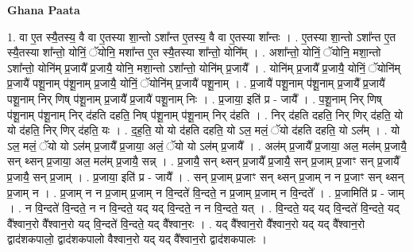\documentclass[17pt]{extarticle}
\begin{document}
\textbf{Ghana Paata } \newline

1. वा ए॒त स्यै॒तस्य॒ वै वा ए॒तस्या शा॒न्तो ऽशा᳚न्त ए॒तस्य॒ वै वा ए॒तस्या शा᳚न्तः । . ए॒तस्या शा॒न्तो ऽशा᳚न्त ए॒त स्यै॒तस्या शा᳚न्तो॒ योनिं॒ ॅयोनि॒ मशा᳚न्त ए॒त स्यै॒तस्या शा᳚न्तो॒ योनि᳚म् । . अशा᳚न्तो॒ योनिं॒ ॅयोनि॒ मशा॒न्तो ऽशा᳚न्तो॒ योनि॑म् प्र॒जायै᳚ प्र॒जायै॒ योनि॒ मशा॒न्तो ऽशा᳚न्तो॒ योनि॑म् प्र॒जायै᳚ । . योनि॑म् प्र॒जायै᳚ प्र॒जायै॒ योनिं॒ ॅयोनि॑म् प्र॒जायै॑ पशू॒नाम् प॑शू॒नाम् प्र॒जायै॒ योनिं॒ ॅयोनि॑म् प्र॒जायै॑ पशू॒नाम् । . प्र॒जायै॑ पशू॒नाम् प॑शू॒नाम् प्र॒जायै᳚ प्र॒जायै॑ पशू॒नाम् निर् णिष् प॑शू॒नाम् प्र॒जायै᳚ प्र॒जायै॑ पशू॒नाम् निः । . प्र॒जाया॒ इति॑ प्र - जायै᳚ । . प॒शू॒नाम् निर् णिष् प॑शू॒नाम् प॑शू॒नाम् निर् द॑हति दहति॒ निष् प॑शू॒नाम् प॑शू॒नाम् निर् द॑हति । . निर् द॑हति दहति॒ निर् णिर् द॑हति॒ यो यो द॑हति॒ निर् णिर् द॑हति॒ यः । . द॒ह॒ति॒ यो यो द॑हति दहति॒ यो ऽल॒ मलं॒ ॅयो द॑हति दहति॒ यो ऽल᳚म् । . यो ऽल॒ मलं॒ ॅयो यो ऽल॑म् प्र॒जायै᳚ प्र॒जाया॒ अलं॒ ॅयो यो ऽल॑म् प्र॒जायै᳚ । . अल॑म् प्र॒जायै᳚ प्र॒जाया॒ अल॒ मल॑म् प्र॒जायै॒ सन् थ्सन् प्र॒जाया॒ अल॒ मल॑म् प्र॒जायै॒ सन्न् । . प्र॒जायै॒ सन् थ्सन् प्र॒जायै᳚ प्र॒जायै॒ सन् प्र॒जाम् प्र॒जाꣳ सन् प्र॒जायै᳚ प्र॒जायै॒ सन् प्र॒जाम् । . प्र॒जाया॒ इति॑ प्र - जायै᳚ । . सन् प्र॒जाम् प्र॒जाꣳ सन् थ्सन् प्र॒जाम् न न प्र॒जाꣳ सन् थ्सन् प्र॒जाम् न । . प्र॒जाम् न न प्र॒जाम् प्र॒जाम् न वि॒न्दते॑ वि॒न्दते॒ न प्र॒जाम् प्र॒जाम् न वि॒न्दते᳚ । . प्र॒जामिति॑ प्र - जाम् । . न वि॒न्दते॑ वि॒न्दते॒ न न वि॒न्दते॒ यद् यद् वि॒न्दते॒ न न वि॒न्दते॒ यत् । . वि॒न्दते॒ यद् यद् वि॒न्दते॑ वि॒न्दते॒ यद् वै᳚श्वान॒रो वै᳚श्वान॒रो यद् वि॒न्दते॑ वि॒न्दते॒ यद् वै᳚श्वान॒रः । . यद् वै᳚श्वान॒रो वै᳚श्वान॒रो यद् यद् वै᳚श्वान॒रो द्वाद॑शकपालो॒ द्वाद॑शकपालो वैश्वान॒रो यद् यद् वै᳚श्वान॒रो द्वाद॑शकपालः । \newline
\end{document}
